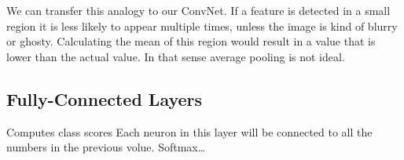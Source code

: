 We can transfer this analogy to our ConvNet. If a feature is detected in a small region it is less likely to appear multiple times, unless the image is kind of blurry or ghosty. Calculating the mean of this region would result in a value that is lower than the actual value. In that sense average pooling is not ideal.


\subsection{Fully-Connected Layers} %
\label{sub:fc_layers}

Computes class scores
Each neuron in this layer will be connected to all the numbers in the previous volue.
Softmax\ldots


